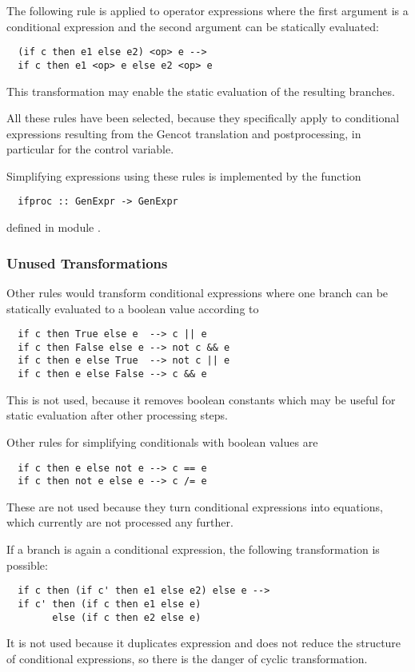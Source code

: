 The following rule is applied to operator expressions where the first argument is a conditional expression and the second argument
can be statically evaluated:
\begin{verbatim}
  (if c then e1 else e2) <op> e -->
  if c then e1 <op> e else e2 <op> e
\end{verbatim}
This transformation may enable the static evaluation of the resulting branches. 

All these rules have been selected, because they specifically apply to conditional expressions resulting from the Gencot translation
and postprocessing, in particular for the control variable.

Simplifying  expressions using these rules is implemented by the function
\begin{verbatim}
  ifproc :: GenExpr -> GenExpr
\end{verbatim}
defined in module .

\subsubsection{Unused Transformations}

Other rules would transform conditional expressions where one branch can be statically evaluated to a boolean value according to
\begin{verbatim}
  if c then True else e  --> c || e
  if c then False else e --> not c && e
  if c then e else True  --> not c || e
  if c then e else False --> c && e
\end{verbatim}
This is not used, because it removes boolean constants which may be useful for static evaluation after other processing steps.

Other rules for simplifying conditionals with boolean values are
\begin{verbatim}
  if c then e else not e --> c == e
  if c then not e else e --> c /= e
\end{verbatim}
These are not used because they turn conditional expressions into equations, which currently are not processed any further.

If a branch is again a conditional expression, the following transformation is possible:
\begin{verbatim}
  if c then (if c' then e1 else e2) else e -->
  if c' then (if c then e1 else e)
        else (if c then e2 else e)
\end{verbatim}
It is not used because it duplicates expression  and does not reduce the structure of conditional expressions,
so there is the danger of cyclic transformation.

